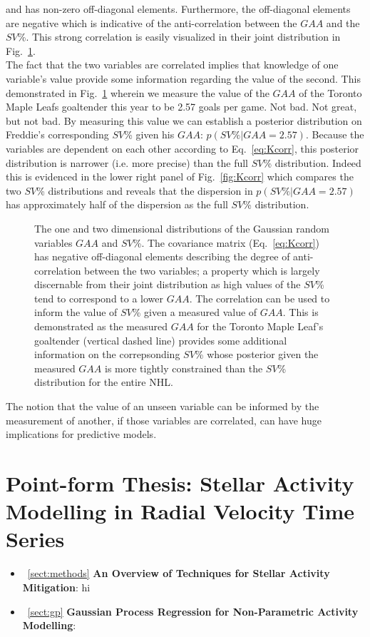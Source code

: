 \noindent and has non-zero off-diagonal elements. Furthermore, the off-diagonal
elements are negative which is indicative of the anti-correlation between the
$GAA$ and the $SV$\%. This strong correlation is easily visualized in their joint
distribution in Fig.~\ref{fig:corr2d}. \\

The fact that the two variables are
correlated implies that knowledge of one variable's value provide some information
regarding the value of the second. This demonstrated in Fig.~\ref{fig:corr2d}
wherein we measure the value of the $GAA$ of the Toronto Maple Leafs goaltender
this year to be 2.57 goals per game. Not bad. Not great, but not bad. By measuring
this value we can establish a posterior distribution on Freddie's corresponding
$SV$\% given his $GAA$: $p(SV\%|GAA=2.57)$. Because the variables are dependent
on each other according to Eq.~\ref{eq:Kcorr}, this posterior distribution is
narrower (i.e. more precise) than the full $SV$\% distribution. Indeed this is
evidenced in the lower right panel of Fig.~\ref{fig:Kcorr} which compares the
two $SV$\% distributions and reveals that the dispersion in $p(SV\%|GAA=2.57)$
has approximately half of the dispersion as the full $SV$\% distribution. \\

\begin{figure}
  \centering
  \caption{The one and two dimensional distributions of the Gaussian random
    variables $GAA$ and $SV$\%.
    The covariance matrix (Eq.~\ref{eq:Kcorr}) has negative off-diagonal
    elements describing the degree of anti-correlation between the two
    variables; a property which is largely discernable from their joint
    distribution as high values of the $SV$\% tend to correspond to a lower
    $GAA$. The correlation can be used to inform the value of $SV$\% given a
    measured value of $GAA$. This is demonstrated as the measured $GAA$ 
    for the Toronto Maple Leaf's goaltender (vertical dashed line) provides some
    additional information on the correpsonding $SV$\% whose posterior given the
    measured $GAA$ is more tightly constrained than the $SV$\% distribution for
    the entire NHL.}
  \label{fig:corr2d}
\end{figure}

The notion that the value of an unseen variable can be informed by the measurement
of another, if those variables are correlated, can have huge implications for
predictive models.


\section{Point-form Thesis: Stellar Activity Modelling in Radial Velocity
  Time Series}
\begin{itemize}
\renewcommand\labelitemi{--}
\item~\ref{sect:methods} \textbf{An Overview of Techniques for Stellar Activity
Mitigation}: hi \\
\item~\ref{sect:gp} \textbf{Gaussian Process Regression for Non-Parametric
  Activity Modelling}:
\end{itemize}
